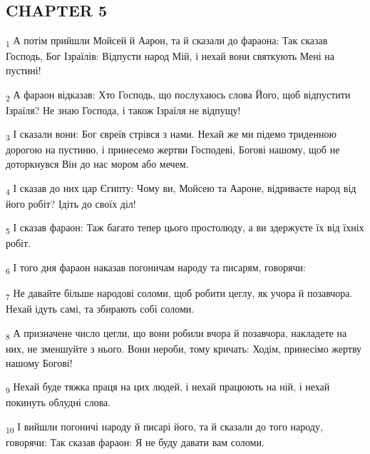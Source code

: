 \subsection{CHAPTER 5}
\begin{tcolorbox}
\textsubscript{1} А потім прийшли Мойсей й Аарон, та й сказали до фараона: Так сказав Господь, Бог Ізраїлів: Відпусти народ Мій, і нехай вони святкують Мені на пустині!
\end{tcolorbox}
\begin{tcolorbox}
\textsubscript{2} А фараон відказав: Хто Господь, що послухаюсь слова Його, щоб відпустити Ізраїля? Не знаю Господа, і також Ізраїля не відпущу!
\end{tcolorbox}
\begin{tcolorbox}
\textsubscript{3} І сказали вони: Бог євреїв стрівся з нами. Нехай же ми підемо триденною дорогою на пустиню, і принесемо жертви Господеві, Богові нашому, щоб не доторкнувся Він до нас мором або мечем.
\end{tcolorbox}
\begin{tcolorbox}
\textsubscript{4} І сказав до них цар Єгипту: Чому ви, Мойсею та Аароне, відриваєте народ від його робіт? Ідіть до своїх діл!
\end{tcolorbox}
\begin{tcolorbox}
\textsubscript{5} І сказав фараон: Таж багато тепер цього простолюду, а ви здержуєте їх від їхніх робіт.
\end{tcolorbox}
\begin{tcolorbox}
\textsubscript{6} І того дня фараон наказав погоничам народу та писарям, говорячи:
\end{tcolorbox}
\begin{tcolorbox}
\textsubscript{7} Не давайте більше народові соломи, щоб робити цеглу, як учора й позавчора. Нехай ідуть самі, та збирають собі соломи.
\end{tcolorbox}
\begin{tcolorbox}
\textsubscript{8} А призначене число цегли, що вони робили вчора й позавчора, накладете на них, не зменшуйте з нього. Вони нероби, тому кричать: Ходім, принесімо жертву нашому Богові!
\end{tcolorbox}
\begin{tcolorbox}
\textsubscript{9} Нехай буде тяжка праця на цих людей, і нехай працюють на ній, і нехай покинуть облудні слова.
\end{tcolorbox}
\begin{tcolorbox}
\textsubscript{10} І вийшли погоничі народу й писарі його, та й сказали до того народу, говорячи: Так сказав фараон: Я не буду давати вам соломи.
\end{tcolorbox}
